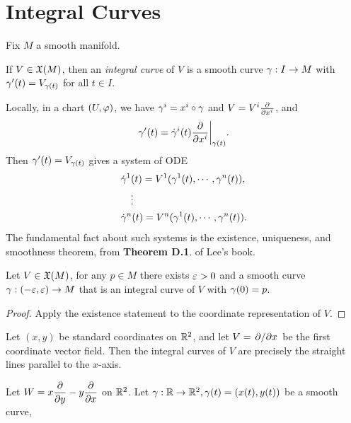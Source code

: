 \section{Integral Curves}
Fix $M$ a smooth manifold. 

If $V \in \frak{X}(M)$, then an \textit{integral curve} of $V$ is a smooth curve $\gamma:I \to M$ with $\gamma'(t) = V_{\gamma(t)}$ for all $t \in I$.

Locally, in a chart $(U,\varphi)$, we have $\gamma^i = x^i \circ \gamma$ and $V = V^i \pdv{}{x^i}$, and 
$$\gamma'(t) = \dot{\gamma}^i(t)\pdv{}{x^i}\bigg|_{\gamma(t)}. $$
Then $\gamma'(t) = V_{\gamma(t)}$ gives a system of ODE
\begin{align*}
&\dot{\gamma}^1(t) = V^1(\gamma^1(t), \cdots, \gamma^n(t)), \\
&\quad \vdots \\
&\dot{\gamma}^n(t) = V^n(\gamma^1(t), \cdots, \gamma^n(t)).
\end{align*}
The fundamental fact about such systems is the existence, uniqueness, and smoothness theorem, from \textbf{Theorem D.1}. of Lee's book. 
\begin{proposition}\label{9.2}
    Let $V \in \frak{X}(M)$, for any $p \in M$ there exists $\varepsilon > 0$ and a smooth curve $\gamma:(-\varepsilon,\varepsilon) \to M$ that is an integral curve of $V$ with $\gamma(0) = p$.
\end{proposition}
\begin{proof}
    Apply the existence statement to the coordinate representation of $V$. 
\end{proof}
\begin{example}
    Let $(x,y)$ be standard coordinates on $\mathbb{R}^2$, and let $V = \pdv*{}{x}$ be the first coordinate vector field. Then the integral curves of $V$ are precisely the straight lines parallel to the $x$-axis. 
\end{example}
\begin{example}
    Let $\displaystyle{W=x\pdv{}{y} - y\pdv{}{x}}$ on $\mathbb{R}^2$. Let $\gamma:\mathbb{R} \to \mathbb{R}^2, \gamma(t) = (x(t),y(t))$ be a smooth curve, 
\end{example}


